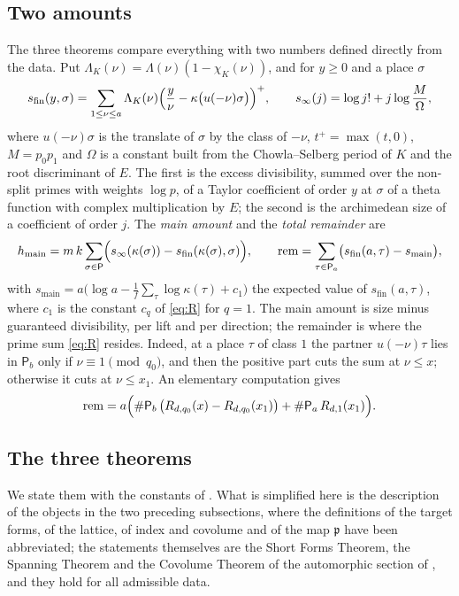 \documentclass[10pt]{amsart}
\theoremstyle{definition}
\theoremstyle{remark}
\newcommand{\hmain}{h_{\mathrm{main}}}
\newcommand{\rem}{\mathrm{rem}}
\newcommand{\Pa}{\mathsf P_a}
\newcommand{\Pb}{\mathsf P_b}
\newcommand{\Pl}{\mathsf P}
\newcommand{\pp}{\mathfrak p}
\begin{document}
\subsection{Two amounts}
The three theorems compare everything with two numbers defined directly from the data. Put
$\Lambda_K(\nu)=\Lambda(\nu)(1-\chi_K(\nu))$, and for $y\ge0$ and a place $\sigma$
\[
 s_{\mathrm{fin}}(y,\sigma)=\sum_{1\le\nu\le a}\Lambda_K(\nu)\Bigl(\frac y\nu-\kappa\bigl(u(-\nu)\sigma\bigr)\Bigr)^{+},
 \qquad s_\infty(j)=\log j!+j\log\frac M\Omega ,
\]
where $u(-\nu)\sigma$ is the translate of $\sigma$ by the class of $-\nu$, $t^+=\max(t,0)$,
$M=p_0p_1$ and $\Omega$ is a constant built from the Chowla--Selberg period of $K$ and the
root discriminant of $E$. The first is the excess divisibility, summed over the non-split primes with
weights $\log p$, of a Taylor coefficient of order $y$ at $\sigma$ of a theta function with
complex multiplication by $E$; the second is the archimedean size of a coefficient of order
$j$. The \emph{main amount} and the \emph{total remainder} are
\[
 \hmain=m\,k\sum_{\sigma\in\Pl}\Bigl(s_\infty(\kappa(\sigma))-s_{\mathrm{fin}}(\kappa(\sigma),\sigma)\Bigr),\qquad
 \rem=\sum_{\tau\in\Pa}\bigl(s_{\mathrm{fin}}(a,\tau)-s_{\mathrm{main}}\bigr),
\]
with $s_{\mathrm{main}}=a\bigl(\log a-\tfrac1f\sum_{\tau}\log\kappa(\tau)+c_1\bigr)$ the expected
value of $s_{\mathrm{fin}}(a,\tau)$, where $c_1$ is the constant $c_q$ of \eqref{eq:R} for $q=1$. The main amount is size minus guaranteed divisibility, per
lift and per direction; the remainder is where the prime sum \eqref{eq:R} resides. Indeed, at a
place $\tau$ of class $1$ the partner $u(-\nu)\tau$ lies in $\Pb$ only if
$\nu\equiv1\pmod{q_0}$, and then the positive part cuts the sum at $\nu\le x$; otherwise it cuts
at $\nu\le x_1$. An elementary computation gives
\begin{equation}\label{eq:rem}
 \rem=a\Bigl(\#\Pb\,\bigl(R_{d,q_0}(x)-R_{d,q_0}(x_1)\bigr)+\#\Pa\,R_{d,1}(x_1)\Bigr).
\end{equation}

\subsection{The three theorems}
We state them with the constants of \cite{P46}. What is simplified here is the description of the
objects in the two preceding subsections, where the definitions of the target forms, of the
lattice, of index and covolume and of the map $\pp$ have been abbreviated; the statements
themselves are the Short Forms Theorem, the Spanning Theorem and the Covolume Theorem of the
automorphic section of \cite{P46}, and they hold for all admissible data.
\end{document}
